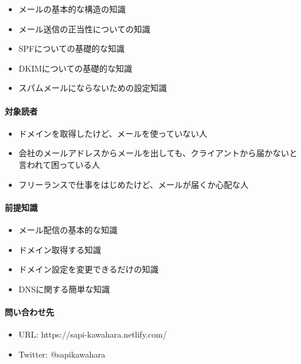 \begin{itemize}
\item メールの基本的な構造の知識
\item メール送信の正当性についての知識
\item SPFについての基礎的な知識
\item DKIMについての基礎的な知識
\item スパムメールにならないための設定知識
\end{itemize}

\paragraph*{対象読者}
\label{sec:-0-0-0-2}

\begin{itemize}
\item ドメインを取得したけど、メールを使っていない人
\item 会社のメールアドレスからメールを出しても、クライアントから届かないと言われて困っている人
\item フリーランスで仕事をはじめたけど、メールが届くか心配な人
\end{itemize}

\paragraph*{前提知識}
\label{sec:-0-0-0-3}

\begin{itemize}
\item メール配信の基本的な知識
\item ドメイン取得する知識
\item ドメイン設定を変更できるだけの知識
\item DNSに関する簡単な知識
\end{itemize}

\paragraph*{問い合わせ先}
\label{sec:-0-0-0-4}

\begin{itemize}
\item URL: https://sapi{-}kawahara.netlify.com/
\item Twitter: @sapi\textunderscore{}kawahara
\end{itemize}
